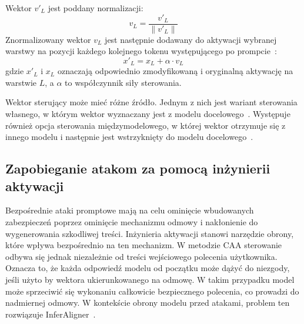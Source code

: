 Wektor $v'_L$ jest poddany normalizacji:
\begin{equation}
    v_L = \frac{v'_L}{\|v'_L\|}
\end{equation}
Znormalizowany wektor $v_L$ jest następnie dodawany do aktywacji wybranej warstwy na pozycji każdego kolejnego tokenu występującego po prompcie~\cite{panickssery2024steeringllama2contrastive}:
\begin{equation}
    x'_L = x_L + \alpha \cdot v_L
\end{equation}
gdzie $x'_L$ i $x_L$ oznaczają odpowiednio zmodyfikowaną i oryginalną aktywację na warstwie $L$, a $\alpha$ to współczynnik siły sterowania.

Wektor sterujący może mieć różne źródło. Jednym z nich jest wariant sterowania własnego, w którym wektor wyznaczany jest z modelu docelowego~\cite{panickssery2024steeringllama2contrastive, turner2024steeringlanguagemodelsactivation}. Występuje również opcja sterowania międzymodelowego, w której wektor otrzymuje się z innego modelu i następnie jest wstrzyknięty do modelu docelowego~\cite{wang2024inferalignerinferencetimealignmentharmlessness, huang2025crossmodeltransferabilitylargelanguage}.

\subsection{Zapobieganie atakom za pomocą inżynierii aktywacji}
Bezpośrednie ataki promptowe mają na celu ominięcie wbudowanych zabezpieczeń poprzez ominięcie mechanizmu odmowy i nakłonienie do wygenerowania szkodliwej treści. Inżynieria aktywacji stanowi narzędzie obrony, które wpływa bezpośrednio na ten mechanizm.
W metodzie CAA sterowanie odbywa się jednak niezależnie od treści wejściowego polecenia użytkownika. Oznacza to, że każda odpowiedź modelu od początku może dążyć do niezgody, jeśli użyto by wektora ukierunkowanego na odmowę. W takim przypadku model może sprzeciwić się wykonaniu całkowicie bezpiecznego polecenia, co prowadzi do nadmiernej odmowy.
W kontekście obrony modelu przed atakami, problem ten rozwiązuje InferAligner~\cite{wang2024inferalignerinferencetimealignmentharmlessness}.

